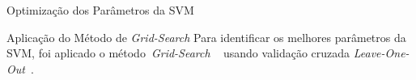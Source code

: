 \documentclass{beamer}
\begin{document}

\begin{frame}{Optimização dos Parâmetros da SVM}
 \begin{block}{Aplicação do Método de \textit{Grid-Search}}
 Para identificar os melhores parâmetros da SVM, foi aplicado o método~\textit{Grid-Search} ~\cite{gridsearchsvm2010} usando validação cruzada \textit{Leave-One-Out}~\cite{kantardzic2011data}.   
 \end{block}
\end{frame}



	





\end{document}
